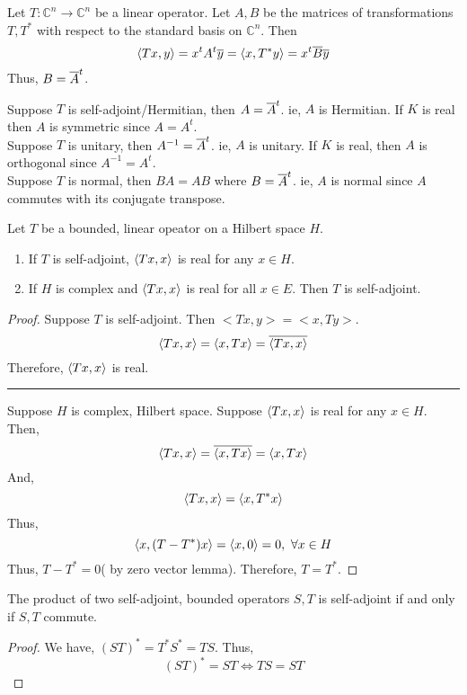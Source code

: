 \begin{remark}
	Let $T : \mathbb{C}^n \to \mathbb{C}^n$ be a linear operator.
	Let $A,B$ be the matrices of transformations $T,T^\ast$ with respect to the standard basis on $\mathbb{C}^n$.
	Then
	\[ \left\langle Tx,y \right\rangle = x^t A^t \overline{y} = \left\langle x,T^\ast y \right\rangle = x^t \overline{B}\overline{y} \]
	Thus, $B  = \overline{A}^t$.
\end{remark}

\begin{remark}
	Suppose $T$ is self-adjoint/Hermitian, then $A = \overline{A}^t$.  ie, $A$ is Hermitian.
	If $K$ is real then $A$ is symmetric since $A = A^t$.\\

	Suppose $T$ is unitary, then $A^{-1} = \overline{A}^t$. ie, $A$ is unitary.
	If $K$ is real, then $A$ is orthogonal since $A^{-1} = A^t$.\\

	Suppose $T$ is normal, then $BA = AB$ where $B = \overline{A}^t$. ie, $A$ is normal since $A$ commutes with its conjugate transpose.
\end{remark}

\begin{theorem}
	Let $T$ be a bounded, linear opeator on a Hilbert space $H$.
	\begin{enumerate}
		\item If $T$ is self-adjoint, $\left\langle Tx,x \right\rangle$ is real for any $x \in H$.
		\item If $H$ is complex and $\left\langle Tx,x \right\rangle$ is real for all $x \in E$.
		Then $T$ is self-adjoint.
	\end{enumerate}
\end{theorem}
\begin{proof}
	Suppose $T$ is self-adjoint.
	Then $<Tx,y> = <x,Ty>$.
	\[ \left\langle Tx,x \right\rangle = \left\langle x,Tx \right\rangle = \overline{\left\langle Tx,x \right\rangle} \]
	Therefore, $\left\langle Tx,x \right\rangle$ is real.\\

	\hrule \vspace{1em}

	Suppose $H$ is complex, Hilbert space.
	Suppose $\left\langle Tx,x \right\rangle$ is real for any $x \in H$.
	Then,
	\[ \left\langle Tx,x \right\rangle = \overline{\left\langle x,Tx \right\rangle} = \left\langle x,Tx \right\rangle \]
	And,
	\[ \left\langle Tx,x \right\rangle = \left\langle x,T^\ast x \right\rangle \]
	Thus,
	\[ \inner{x}{(T-T^\ast)x} = \inner{x}{0} = 0,\ \forall x \in H \]
	Thus, $T-T^\ast = 0$( by zero vector lemma).
	Therefore, $T = T^\ast$.
\end{proof}

\begin{theorem}
	The product of two self-adjoint, bounded operators $S,T$ is self-adjoint if and only if $S,T$ commute.
\end{theorem}
\begin{proof}
	We have, $(ST)^\ast = T^\ast S^\ast = TS$.
	Thus,
	\[ (ST)^\ast = ST \iff TS = ST \]
\end{proof}

